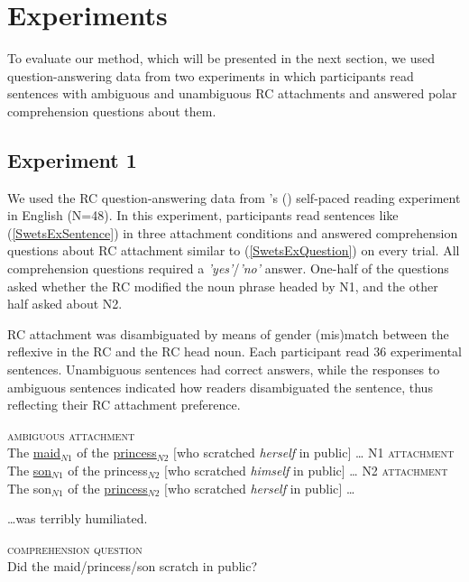 \documentclass[11pt]{article}\usepackage[]{graphicx}\usepackage[]{color}
\def\citeapos#1{\citeauthor{#1}'s (\citeyear{#1})}
\begin{document}
\section{Experiments}

To evaluate our method, which will be presented in the next section, we used question-answering data from two experiments in which participants read sentences with ambiguous and unambiguous RC attachments and answered polar comprehension questions about them.

\subsection{Experiment 1}
We used the RC question-answering data from \citeapos{SwetsEtAl:2008} self-paced reading experiment in English (N=48). In this experiment, participants read sentences like (\ref{SwetsExSentence}) in three attachment conditions and answered comprehension questions about RC attachment similar to (\ref{SwetsExQuestion}) on every trial. All comprehension questions required a \textit{'yes'}/\textit{'no'} answer. One-half of the questions asked whether the RC modified the noun phrase headed by N1, and the other half asked about N2.

RC attachment was disambiguated by means of gender (mis)match between the reflexive in the RC and the RC head noun. Each participant read 36 experimental sentences. Unambiguous sentences had correct answers, while the responses to ambiguous sentences indicated how readers disambiguated the sentence, thus reflecting their RC attachment preference.

\begin{exe}
\ex \label{SwetsExSentence} 
\begin{xlist}
    \ex \textsc{ambiguous attachment} \\
        The \uline{maid}$_{N1}$ of the \uline{princess}$_{N2}$ $[$who scratched \textit{herself} in public$]$ \ldots
    \ex \textsc{N1 attachment} \\
        The \uline{son}$_{N1}$ of the princess$_{N2}$ $[$who scratched \textit{himself} in public$]$ \ldots
    \ex  \textsc{N2 attachment}\\
        The son$_{N1}$ of the \uline{princess}$_{N2}$ $[$who scratched \textit{herself} in public$]$ \ldots
\end{xlist}
\ldots was terribly humiliated.
\end{exe}

\begin{exe}
\ex \label{SwetsExQuestion} \textsc{comprehension question} \\ 
    Did the maid/princess/son scratch in public?
\end{exe}
\end{document}
